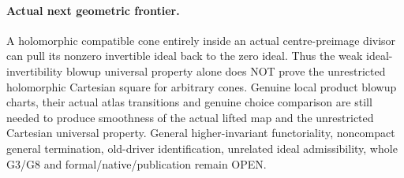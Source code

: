 \paragraph{Actual next geometric frontier.}
A holomorphic compatible cone entirely inside an actual centre-preimage divisor can pull its nonzero invertible ideal back to the zero ideal. Thus the weak ideal-invertibility blowup universal property alone does NOT prove the unrestricted holomorphic Cartesian square for arbitrary cones. Genuine local product blowup charts, their actual atlas transitions and genuine choice comparison are still needed to produce smoothness of the actual lifted map and the unrestricted Cartesian universal property. General higher-invariant functoriality, noncompact general termination, old-driver identification, unrelated ideal admissibility, whole G3/G8 and formal/native/publication remain OPEN. 

